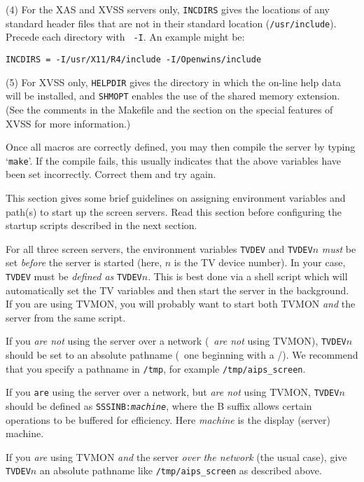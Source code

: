     (4) For the XAS and XVSS servers only, {\tt INCDIRS} gives the
locations of any standard header files that are not in their standard
location ({\tt /usr/include}).  Precede each directory with \hbox{{\tt
-I}}.  An example might be:

\noindent
{\tt INCDIRS = -I/usr/X11/R4/include -I/Openwins/include}

    (5) For XVSS only, {\tt HELPDIR} gives the directory in which the
on-line help data will be installed, and {\tt SHMOPT} enables the use
of the shared memory extension.  (See the comments in the Makefile
and the section on the special features of XVSS for more information.)

Once all macros are correctly defined, you may then compile the server
by typing `{\tt make}'.  If the compile fails, this usually indicates
that the above variables have been set incorrectly.  Correct them and
try again.


This section gives some brief guidelines on assigning environment
variables and path(s) to start up the screen servers.  Read this section
before configuring the startup scripts described in the next section.

For all three screen servers, the environment variables {\tt TVDEV}
and {\tt TVDEV$n$} {\it must} be set {\it before} the server is started
(here, $n$ is the TV device number).  In your case, {\tt TVDEV} must be
{\it defined as} \hbox{{\tt TVDEV$n$}}.  This is best done via a shell
script which will automatically set the TV variables and then start
the server in the background.  If you are using TVMON, you will
probably want to start both TVMON {\it and} the server from the same
script.

If you {\it are not} using the server over a network (\ie\ {\it are not}
using TVMON), {\tt TVDEV$n$} should be set to an absolute pathname
(\ie\ one beginning with a /).  We recommend that you specify a pathname
in {\tt /tmp}, for example {\tt /tmp/aips\_screen}.

If you {\tt are} using the server over a network, but {\it are not} using
TVMON, {\tt TVDEV$n$} should be defined as {\tt SSSINB:{\it machine\/}},
where the B suffix allows certain operations to be buffered for efficiency.
Here {\it machine\/} is the display (server) machine.

If you {\it are} using TVMON {\it and} the server {\it over the network}
(the usual case), give {\tt TVDEV$n$} an absolute pathname like
{\tt /tmp/aips\_screen} as described above.


